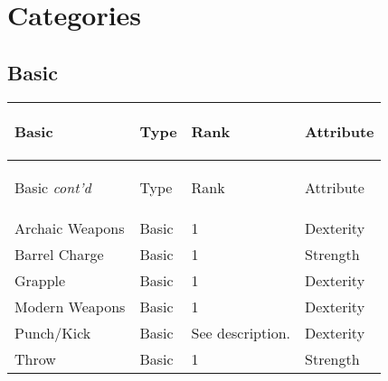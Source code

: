 \documentclass[twoside]{book}
\begin{document}
\section{Categories}
    
    

\subsection{Basic}
    
\begin{longtable}{p{1.25in}lll} 
  Basic
  &
  \begin{turn}{70}{Type}\end{turn}
          
  &
  \begin{turn}{70}{Rank}\end{turn}
          
  &
  \begin{turn}{70}{Attribute}\end{turn}
          
  \\
  \hline
  \hline
  \endfirsthead
  Basic \textit{cont'd}
        
  &
  \begin{turn}{70}{Type}\end{turn}
          
  &
  \begin{turn}{70}{Rank}\end{turn}
          
  &
  \begin{turn}{70}{Attribute}\end{turn}
          
  \\
  \hline
  \endhead
      
  \raggedright
           Archaic Weapons 
  &
   Basic 
  &
   1 
  &
   Dexterity 
  \tabularnewline
      
  \raggedright
           Barrel Charge 
  &
   Basic 
  &
   1 
  &
   Strength 
  \tabularnewline
      
  \raggedright
           Grapple 
  &
   Basic 
  &
   1 
  &
   Dexterity 
  \tabularnewline
      
  \raggedright
           Modern Weapons 
  &
   Basic 
  &
   1 
  &
   Dexterity 
  \tabularnewline
      
  \raggedright
           Punch/Kick 
  &
   Basic 
  &
   See description. 
  &
   Dexterity 
  \tabularnewline
      
  \raggedright
           Throw 
  &
   Basic 
  &
   1 
  &
   Strength 
  \tabularnewline
      
\end{longtable}
    
\end{document}
